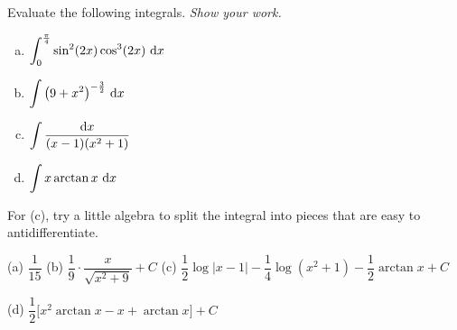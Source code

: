 \begin{question}[2001A]
Evaluate the following integrals. \emph{Show your work.}
\begin{enumerate}[(a)]
\item
$\displaystyle\int_0^{\pi\over 4}\sin^2(2x)\cos^3(2x)\ \mathrm{d}x$
\item
$\displaystyle\int\big(9+x^2\big)^{-{3\over 2}}\ \dee{x}$
\item
$\displaystyle\int\frac{\mathrm{d}x}{(x-1)(x^2+1)}$
\item
 $\displaystyle\int x\arctan x\ \dee{x}$
\end{enumerate}
\end{question}

\begin{hint}
For (c), try a little algebra to split the integral into pieces that are easy to antidifferentiate.
\end{hint}

\begin{answer} (a)
$\dfrac{1}{15}$
\qquad (b)
$\dfrac{1}{9}\cdot\dfrac{x}{\sqrt{x^2+9}}+C$
\qquad (c)
$\dfrac{1}{2}\log|x-1|-\dfrac{1}{4}\log(x^2+1)-\dfrac{1}{2}\arctan x+C$

\noindent (d)
$\dfrac12\big[ x^2\arctan  x -x +\arctan x\big]+C$
\end{answer}

